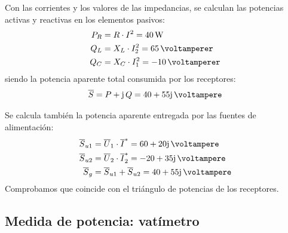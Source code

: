 \begin{example}
          \vspace{-3mm}
          Con las corrientes y los valores de las impedancias, se
          calculan las potencias activas y reactivas en los elementos pasivos:
          \begin{align*}
            P_R&=R\cdot I^2=\qty{40}{\watt}\\
            Q_L &= X_L\cdot I_2^2=\qty{65}{\voltamperer}\\
            Q_C&=X_C\cdot I_1^2=-\qty{10}{\voltamperer}
          \end{align*}
          siendo la potencia aparente total consumida por los
          receptores:
          \begin{equation*}
            \overline{S}=P+\mathrm{j}\,Q= 40 + 55\mathrm{j}\,\unit{\voltampere}
          \end{equation*}
		
          Se calcula también la potencia aparente entregada por las
          fuentes de alimentación:
          \begin{align*}
            \overline{S}_{u1}&=\overline{U}_1\cdot \overline{I}^*= 60 + 20\mathrm{j}\,\unit{\voltampere}\\
            \overline{S}_{u2}&=\overline{U}_2\cdot \overline{I}_2^*= -20 + 35\mathrm{j}\,\unit{\voltampere}\\
            \overline{S}_g &= \overline{S}_{u1} + \overline{S}_{u2} = 40 + 55\mathrm{j}\,\unit{\voltampere}
          \end{align*}
          Comprobamos que coincide con el triángulo de potencias de los receptores.
                        
	\end{example}
	
	\subsection{Medida de potencia: vatímetro}\label{sec.medida_potencia}
	
